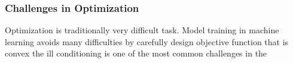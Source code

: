 \subsubsection{Challenges in Optimization}

Optimization is traditionally very difficult task. Model training in machine learning avoids many difficulties by carefully design objective function that is convex 
the ill conditioning is one of the most common challenges in the 